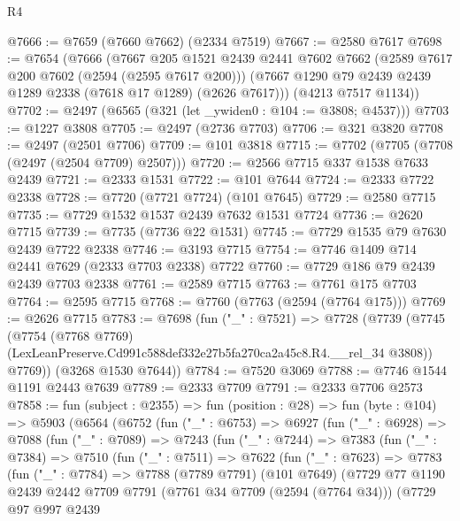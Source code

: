 \begin{lexlean}{R4}
\begin{coremodule}
@7666 := @7659 (@7660 @7662) (@2334 @7519)
@7667 := @2580 @7617
@7698 := @7654
    (@7666
      (@7667
        @205
        @1521
        @2439
        @2441
        @7602
        @7662
        (@2589 @7617 @200 @7602 (@2594 (@2595 @7617 @200)))
        (@7667 @1290 @79 @2439 @2439 @1289 @2338 (@7618 @17 @1289) (@2626 @7617)))
      (@4213 @7517 @1134))
@7702 := @2497 (@6565 (@321 (let _ywiden0 : @104 := @3808; @4537)))
@7703 := @1227 @3808
@7705 := @2497 (@2736 @7703)
@7706 := @321 @3820
@7708 := @2497 (@2501 @7706)
@7709 := @101 @3818
@7715 := @7702 (@7705 (@7708 (@2497 (@2504 @7709) @2507)))
@7720 := @2566 @7715 @337 @1538 @7633 @2439
@7721 := @2333 @1531
@7722 := @101 @7644
@7724 := @2333 @7722 @2338
@7728 := @7720 (@7721 @7724) (@101 @7645)
@7729 := @2580 @7715
@7735 := @7729 @1532 @1537 @2439 @7632 @1531 @7724
@7736 := @2620 @7715
@7739 := @7735 (@7736 @22 @1531)
@7745 := @7729 @1535 @79 @7630 @2439 @7722 @2338
@7746 := @3193 @7715
@7754 := @7746 @1409 @714 @2441 @7629 (@2333 @7703 @2338) @7722
@7760 := @7729 @186 @79 @2439 @2439 @7703 @2338
@7761 := @2589 @7715
@7763 := @7761 @175 @7703
@7764 := @2595 @7715
@7768 := @7760 (@7763 (@2594 (@7764 @175)))
@7769 := @2626 @7715
@7783 := @7698
    (fun ("_" : @7521) =>
    @7728
      (@7739
        (@7745
          (@7754
            (@7768 @7769)
            (LexLeanPreserve.Cd991c588def332e27b5fa270ca2a45c8.R4.__rel_34 @3808))
          @7769))
      (@3268 @1530 @7644))
@7784 := @7520 @3069
@7788 := @7746 @1544 @1191 @2443 @7639
@7789 := @2333 @7709
@7791 := @2333 @7706 @2573
@7858 := fun (subject : @2355) =>
  fun (position : @28) =>
  fun (byte : @104) =>
  @5903
    (@6564
      (@6752
        (fun ("_" : @6753) =>
        @6927
          (fun ("_" : @6928) =>
          @7088
            (fun ("_" : @7089) =>
            @7243
              (fun ("_" : @7244) =>
              @7383
                (fun ("_" : @7384) =>
                @7510
                  (fun ("_" : @7511) =>
                  @7622
                    (fun ("_" : @7623) =>
                    @7783
                      (fun ("_" : @7784) =>
                      @7788
                        (@7789 @7791)
                        (@101 @7649)
                        (@7729
                          @77
                          @1190
                          @2439
                          @2442
                          @7709
                          @7791
                          (@7761 @34 @7709 (@2594 (@7764 @34)))
                          (@7729
                            @97
                            @997
                            @2439

\end{coremodule}
\end{lexlean}
